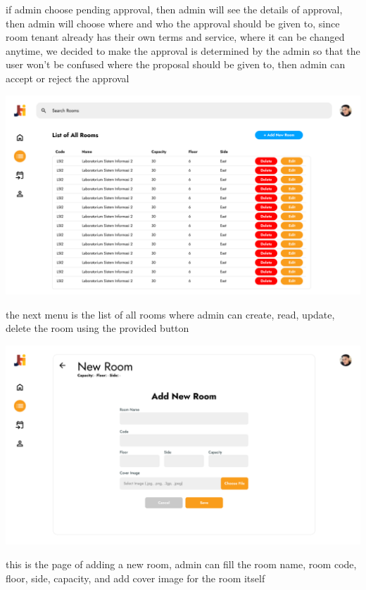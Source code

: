 \documentclass[12pt,titlepage,a4paper]{report}
\begin{document}
    if admin choose pending approval, then admin will see the details of approval, then admin will choose where and who the approval should be given to, since room tenant already has their own terms and service, where it can be changed anytime, we decided to make the approval is determined by the admin so that the user won't be confused where the proposal should be given to, then admin can accept or reject the approval
    \begin{center}
        \includegraphics[width=\textwidth]{images/figures/UIUX/list 1.png}\\
    \end{center}
    the next menu is the list of all rooms where admin can create, read, update, delete the room using the provided button
    \begin{center}
        \includegraphics[width=\textwidth]{images/figures/UIUX/add_new_room.png}\\
    \end{center}
    this is the page of adding a new room, admin can fill the room name, room code, floor, side, capacity, and add cover image for the room itself
\end{document}

